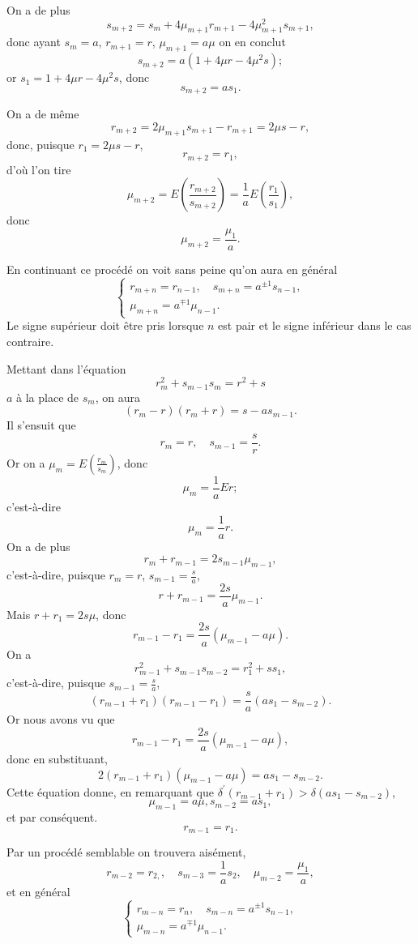 \documentclass[oneside, 12 pt, leqno]{memoir}
\begin{document}
On a de plus
\[s_{m+2}=s_m+4 \mu_{m+1} r_{m+1}-4 \mu_{m+1}^2 s_{m+1},\]
donc ayant \(s_m=a\), \(r_{m+1}=r\), \(\mu_{m+1}=a \mu\) on en conclut
\[s_{m+2}=a\left(1+4 \mu r-4 \mu^2 s\right);\]
or \(s_1=1+4 \mu r-4 \mu^2 s\), donc
\[s_{m+2}=a s_1.\]

On a de même
\[r_{m+2}=2 \mu_{m+1} s_{m+1}-r_{m+1}=2 \mu s-r,\]
donc, puisque \(r_1=2 \mu s-r\),
\[r_{m+2}=r_1,\]
d'où l'on tire
\[\mu_{m+2}=E\left(\frac{r_{m+2}}{s_{m+2}}\right)=\frac{1}{a} E\left(\frac{r_1}{s_1}\right),\]
donc
\[\mu_{m+2}=\frac{\mu_1}{a}.\]

En continuant ce procédé on voit sans peine qu’on aura en général
\[\tag{41}\left\{\begin{array}{l} r_{m+n}=r_{n-1}, \quad s_{m+n}=a^{\pm1} s_{n-1}, \\
\mu_{m+n}=a^{\mp 1} \mu_{n-1}. \end{array}\right.\]
Le signe supérieur doit être pris lorsque \(n\) est pair et le signe inférieur dans le cas contraire.

Mettant dans l'équation
\[r_m^2+s_{m-1} s_m=r^2+s\]
\(a\) à la place de \(s_m\), on aura
\[\left(r_m-r\right)\left(r_m+r\right)=s-a s_{m-1}.\]
Il s'ensuit que
\[r_m=r, \quad s_{m-1}=\frac{s}{r}.\]
Or on a \(\mu_m=E\left(\frac{r_m}{s_m}\right)\), donc
\[\mu_m=\frac{1}{a} E r;\]
c'est-à-dire
\[\mu_m=\frac{1}{a} r.\]
On a de plus
\[r_m+r_{m-1}=2 s_{m-1} \mu_{m-1},\]
c'est-à-dire, puisque \(r_m=r\), \(s_{m-1}=\frac{s}{a}\),
\[r+r_{m-1}=\frac{2 s}{a} \mu_{m-1}.\]
Mais \(r+r_1=2 s \mu\), donc
\[r_{m-1}-r_1=\frac{2 s}{a}\left(\mu_{m-1}-a \mu\right).\]
On a
\[r_{m-1}^2+s_{m-1} s_{m-2}=r_1^2+s s_1,\]
c'est-à-dire, puisque \(s_{m-1}=\frac{s}{a}\),
\[\left(r_{m-1}+r_1\right)\left(r_{m-1}-r_1\right)=\frac{s}{a}\left(a s_1-s_{m-2}\right).\]
Or nous avons vu que
\[r_{m-1}-r_1=\frac{2 s}{a}\left(\mu_{m-1}-a \mu\right),\]
donc en substituant,
\[2\left(r_{m-1}+r_1\right)\left(\mu_{m-1}-a \mu\right)=a s_1-s_{m-2}.\]
Cette équation donne, en remarquant que \(\delta^{\prime}\left(r_{m-1}+r_1\right)>\delta\left(a s_1-s_{m-2}\right)\),
\[\mu_{m-1}=a \mu, s_{m-2}=a s_1,\]
et par conséquent.
\[r_{m-1}=r_1.\]

Par un procédé semblable on trouvera aisément,
\[r_{m-2}=r_{2,}, \quad s_{m-3}=\frac{1}{a} s_2, \quad \mu_{m-2}=\frac{\mu_1}{a},\]
et en général
\[\tag{42}\left\{\begin{array}{l}r_{m-n}=r_n, \quad s_{m-n}=a^{ \pm 1} s_{n-1}, \\
\mu_{m-n}=a^{\mp 1} \mu_{n-1}.\end{array}\right.\]
\end{document}
